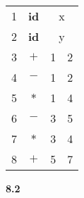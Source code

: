 \documentclass[UTF8]{report}
\newcommand{\tbf}[1]{\textbf{#1}}
\begin{document}
\begin{center}
    \begin{tabular}{c|c|c|c|}
        \cline{2-4}
        1 & \tbf{id} & \multicolumn{2}{c|}{x} \\
        \cline{2-4}
        2 & \tbf{id} & \multicolumn{2}{c|}{y} \\
        \cline{2-4}
        3 & $+$ & 1 & 2 \\
        \cline{2-4}
        4 & $-$ & 1 & 2 \\
        \cline{2-4}
        5 & $*$ & 1 & 4 \\
        \cline{2-4}
        6 & $-$ & 3 & 5 \\
        \cline{2-4}
        7 & $*$ & 3 & 4 \\
        \cline{2-4}
        8 & $+$ & 5 & 7 \\
        \cline{2-4}
    \end{tabular}
\end{center}

\noindent
\tbf{8.2}
\end{document}
